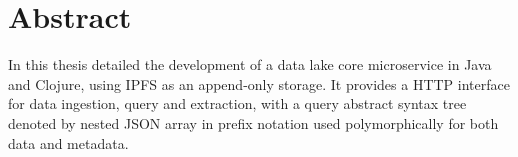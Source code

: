 \chapter{Abstract}
In this thesis detailed the development of a data lake core microservice
in Java and Clojure, using IPFS as an append-only storage.  It provides
a HTTP interface for data ingestion, query and extraction, with a query
abstract syntax tree denoted by nested JSON array in prefix notation
used polymorphically for both data and metadata.
